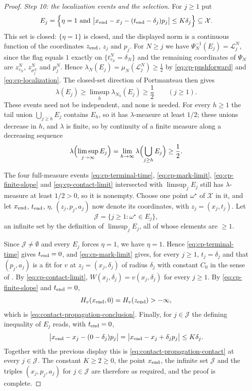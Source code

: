 \begin{proof}
\emph{Step 10: the localization events and the selection.}
For $j\ge1$ put
\[
  E_j=\Bigl\{\eta=1\ \text{and}\
    \bigl|x_{\rm end}-x_j-(t_{\rm end}-\delta_j)p_j\bigr|\le K\delta_j\Bigr\}
  \subseteq\mathcal X .
\]
This set is closed: $\{\eta=1\}$ is closed, and the displayed norm is a
continuous function of the coordinates $z_{\rm end}$, $z_j$ and $p_j$. For
$N\ge j$ we have $\Psi_N^{-1}(E_j)=\mathcal L^N_j$, since the flag equals $1$
exactly on $\{t^N_{\tau_N}=\delta_N\}$ and the remaining coordinates of
$\Psi_N$ are $z^N_{\tau_N}$, $z^N_{\sigma^N_j}$ and $p^N_j$. Hence
$\lambda_N(E_j)=\mu_N(\mathcal L^N_j)\ge\tfrac12$ by \eqref{eq:cp-pushforward}
and \eqref{eq:cp-localization}. The closed-set direction of Portmanteau then
gives
\[
  \lambda(E_j)\ge\limsup_h\lambda_{N_h}(E_j)\ge\frac12\qquad(j\ge1).
\]
These events need not be independent, and none is needed. For every $h\ge1$ the
tail union $\bigcup_{j\ge h}E_j$ contains $E_h$, so it has
$\lambda$-measure at least $1/2$; these unions decrease in $h$, and $\lambda$
is finite, so by continuity of a finite measure along a decreasing sequence
\begin{equation}\label{eq:cp-limsup}
  \lambda\Bigl(\limsup_{j\to\infty}E_j\Bigr)
   =\lim_{h\to\infty}\lambda\Bigl(\bigcup_{j\ge h}E_j\Bigr)\ge\frac12 .
\end{equation}

The four full-measure events \eqref{eq:cp-terminal-time},
\eqref{eq:cp-mark-limit}, \eqref{eq:cp-finite-slope} and
\eqref{eq:cp-contact-limit} intersected with $\limsup_jE_j$ still has
$\lambda$-measure at least $1/2>0$, so it is nonempty. Choose one point
$\omega^\star$ of $\mathcal X$ in it, and let
$x_{\rm end}$, $t_{\rm end}$, $\eta$, $(z_j,p_j,a_j)$ now denote its
coordinates, with $z_j=(x_j,t_j)$. Let
\[
  \mathcal J=\{j\ge1:\omega^\star\in E_j\},
\]
an infinite set by the definition of $\limsup_jE_j$, all of whose elements are
$\ge1$.

Since $\mathcal J\ne\emptyset$ and every $E_j$ forces $\eta=1$, we have
$\eta=1$. Hence \eqref{eq:cp-terminal-time} gives $t_{\rm end}=0$, and
\eqref{eq:cp-mark-limit} gives, for every $j\ge1$, $t_j=\delta_j$ and that
$(p_j,a_j)$ is a fit for $v$ at $z_j=(x_j,\delta_j)$ of radius $\delta_j$ with
constant $C_0$ in the sense of \noderef{IsFit}. By
\eqref{eq:cp-contact-limit}, $W(x_j,\delta_j)=v(x_j,\delta_j)$ for every
$j\ge1$. By \eqref{eq:cp-finite-slope} and $t_{\rm end}=0$,
\[
  H_v(x_{\rm end},0)=H_v(z_{\rm end})>-\infty,
\]
which is \eqref{eq:contact-propagation-conclusion}. Finally, for $j\in\mathcal
J$ the defining inequality of $E_j$ reads, with $t_{\rm end}=0$,
\[
  \bigl|x_{\rm end}-x_j-(0-\delta_j)p_j\bigr|
   =\bigl|x_{\rm end}-x_j+\delta_jp_j\bigr|\le K\delta_j .
\]
Together with the previous display this is
\eqref{eq:contact-propagation-contact} at every $j\in\mathcal J$. The constant
$K\ge2\ge0$, the point $x_{\rm end}$, the infinite set $\mathcal J$ and the
triples $(x_j,p_j,a_j)$ for $j\in\mathcal J$ are therefore as required, and the
proof is complete.
\end{proof}
